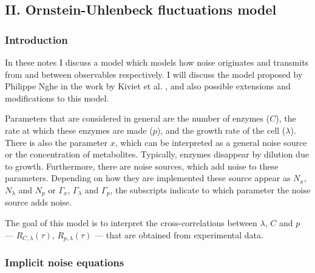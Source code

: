 


\subsection*{II. Ornstein-Uhlenbeck fluctuations model}

\subsubsection*{Introduction}

In these notes I discuss a model which models how noise originates and transmits from and between observables respectively. I will discuss the model proposed by Philippe Nghe in the work by Kiviet et al. \cite{Kiviet2014}, and also possible extensions and modifications to this model.

Parameters that are considered in general are the number of enzymes ($C$), the rate at which these enzymes are made ($p$), and the growth rate of the cell ($\lambda$). There is also the parameter $x$, which can be interpreted as a general noise source or the concentration of metabolites. Typically, enzymes disappear by dilution due to growth. Furthermore, there are noise sources, which add noise to these parameters. Depending on how they are implemented these source appear as $N_x$, $N_\lambda$ and $N_p$ or $\Gamma_x$, $\Gamma_\lambda$ and $\Gamma_p$, the subscripts indicate to which parameter the noise source adds noise.

The goal of this model is to interpret the cross-correlations between $\lambda$, $C$ and $p$ --- $R_{C,\lambda}(\tau)$, $R_{p,\lambda}(\tau)$ --- that are obtained from experimental data.

\subsubsection*{Implicit noise equations}


